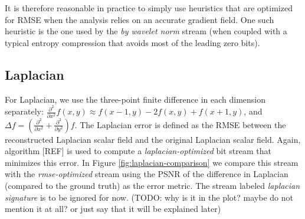 It is therefore reasonable in practice to simply use heuristics that are optimized for RMSE when the
analysis relies on an accurate gradient field. One such heuristic is the one used by the \emph{by
wavelet norm} stream (when coupled with a typical entropy compression that avoids most of the
leading zero bits).

\subsection{Laplacian}

For Laplacian, we use the three-point finite difference in each dimension separately:
$\frac{{\partial}^2}{\partial{x^2}}f(x,y) \approx f(x-1,y)-2f(x,y)+f(x+1,y)$, and $\Delta
f=(\frac{{\partial}^2}{\partial{x^2}}+\frac{{\partial}^2}{\partial{y^2}})f$. The Laplacian error is
defined as the RMSE between the reconstructed Laplacian scalar field and the original Laplacian
scalar field. Again, algorithm [REF] is used to compute a \emph{laplacian-optimized} bit stream that
minimizes this error. In Figure \ref{fig:laplacian-comparison} we compare this stream with the
\emph{rmse-optimized} stream using the PSNR of the difference in Laplacian (compared to the
ground truth) as the error metric. The stream labeled \emph{laplacian signature} is to be ignored for
now. (TODO: why is it in the plot? maybe do not mention it at all? or just say that it will be explained later)


